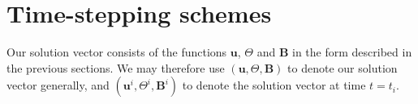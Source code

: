 
\section{ Time-stepping schemes }
\label{sec:timesteppingscheme}

Our solution vector consists of the functions
${\bm u}$, $\Theta$ and ${\bm B}$ in the form
described in the previous sections.
We may therefore use $({\bm u}, \Theta, {\bm B})$ to
denote our solution vector generally, and
$({\bm u}^{i}, \Theta^{i}, {\bm B}^{i})$ to denote
the solution vector at time $t = t_i$.

